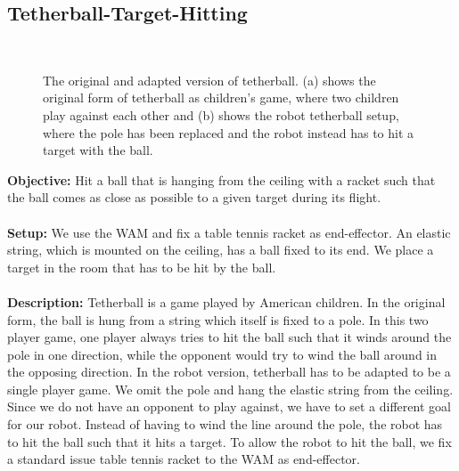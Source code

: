 \documentclass[11pt, article, colorback]{article}
\begin{document}
\subsection{Tetherball-Target-Hitting}
%
\begin{figure}
{\centering
\mbox{\quad
{} }
\caption{The original and adapted version of tetherball. (a) shows the original form of tetherball as children's game, 
where two children play against each other and (b) shows the robot tetherball setup, where the pole has been replaced
and the robot instead has to hit a target with the ball.} }
\end{figure}
%
\textbf{Objective:} Hit a ball that is hanging from the ceiling with a racket such that the ball comes as close as possible to a given target during its flight. \\ \\
%
\textbf{Setup:} We use the WAM and fix a table tennis racket as end-effector. An 
elastic string, which is mounted on the ceiling, has a ball fixed to its end. We place a target in the room that has to be hit by the ball. \\ \\
%
\textbf{Description:} Tetherball is a game played by American children. In the original form, the ball is hung from a string which itself 
is fixed to a pole. In this two player game, one player always tries to hit the ball such that it winds around the pole in one 
direction, while the opponent would try to wind the ball around in the opposing direction. In the robot version, tetherball 
has to be adapted to be a single player game. We omit the pole and hang the elastic string from 
the ceiling. Since we do not have an opponent to play against, we have to set a different goal for our robot. Instead of having 
to wind the line around the pole, the robot has to hit the ball such that it hits a target. To allow the robot to hit the ball, we 
fix a standard issue table tennis racket to the WAM as end-effector.
\end{document}

